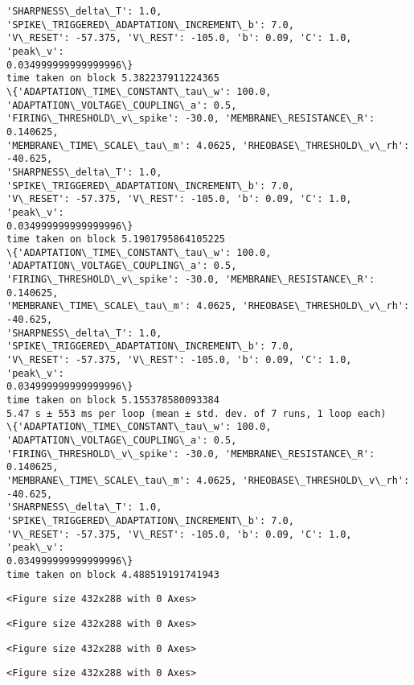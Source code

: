 \documentclass[11pt]{article}
\begin{document}
\begin{Verbatim}[commandchars=\\\{\}]
'SHARPNESS\_delta\_T': 1.0, 'SPIKE\_TRIGGERED\_ADAPTATION\_INCREMENT\_b': 7.0,
'V\_RESET': -57.375, 'V\_REST': -105.0, 'b': 0.09, 'C': 1.0, 'peak\_v':
0.034999999999999996\}
time taken on block 5.382237911224365
\{'ADAPTATION\_TIME\_CONSTANT\_tau\_w': 100.0, 'ADAPTATION\_VOLTAGE\_COUPLING\_a': 0.5,
'FIRING\_THRESHOLD\_v\_spike': -30.0, 'MEMBRANE\_RESISTANCE\_R': 0.140625,
'MEMBRANE\_TIME\_SCALE\_tau\_m': 4.0625, 'RHEOBASE\_THRESHOLD\_v\_rh': -40.625,
'SHARPNESS\_delta\_T': 1.0, 'SPIKE\_TRIGGERED\_ADAPTATION\_INCREMENT\_b': 7.0,
'V\_RESET': -57.375, 'V\_REST': -105.0, 'b': 0.09, 'C': 1.0, 'peak\_v':
0.034999999999999996\}
time taken on block 5.1901795864105225
\{'ADAPTATION\_TIME\_CONSTANT\_tau\_w': 100.0, 'ADAPTATION\_VOLTAGE\_COUPLING\_a': 0.5,
'FIRING\_THRESHOLD\_v\_spike': -30.0, 'MEMBRANE\_RESISTANCE\_R': 0.140625,
'MEMBRANE\_TIME\_SCALE\_tau\_m': 4.0625, 'RHEOBASE\_THRESHOLD\_v\_rh': -40.625,
'SHARPNESS\_delta\_T': 1.0, 'SPIKE\_TRIGGERED\_ADAPTATION\_INCREMENT\_b': 7.0,
'V\_RESET': -57.375, 'V\_REST': -105.0, 'b': 0.09, 'C': 1.0, 'peak\_v':
0.034999999999999996\}
time taken on block 5.155378580093384
5.47 s ± 553 ms per loop (mean ± std. dev. of 7 runs, 1 loop each)
\{'ADAPTATION\_TIME\_CONSTANT\_tau\_w': 100.0, 'ADAPTATION\_VOLTAGE\_COUPLING\_a': 0.5,
'FIRING\_THRESHOLD\_v\_spike': -30.0, 'MEMBRANE\_RESISTANCE\_R': 0.140625,
'MEMBRANE\_TIME\_SCALE\_tau\_m': 4.0625, 'RHEOBASE\_THRESHOLD\_v\_rh': -40.625,
'SHARPNESS\_delta\_T': 1.0, 'SPIKE\_TRIGGERED\_ADAPTATION\_INCREMENT\_b': 7.0,
'V\_RESET': -57.375, 'V\_REST': -105.0, 'b': 0.09, 'C': 1.0, 'peak\_v':
0.034999999999999996\}
time taken on block 4.488519191741943
    \end{Verbatim}

    
    \begin{verbatim}
<Figure size 432x288 with 0 Axes>
    \end{verbatim}

    
    
    \begin{verbatim}
<Figure size 432x288 with 0 Axes>
    \end{verbatim}

    
    
    \begin{verbatim}
<Figure size 432x288 with 0 Axes>
    \end{verbatim}

    
    
    \begin{verbatim}
<Figure size 432x288 with 0 Axes>
    \end{verbatim}
\end{document}
